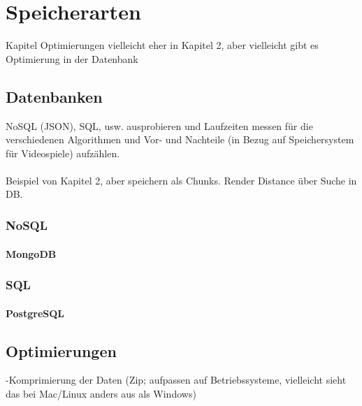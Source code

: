 \chapter{Speicherarten}\label{ch:speicherarten}

Kapitel Optimierungen vielleicht eher in Kapitel 2, aber vielleicht gibt es 
Optimierung in der Datenbank

\section{Datenbanken}
NoSQL (JSON), SQL, usw. ausprobieren und Laufzeiten messen für die verschiedenen Algorithmen 
und Vor- und Nachteile (in Bezug auf Speichersystem für Videospiele) aufzählen.\\
\\
Beispiel von Kapitel 2, aber speichern als Chunks. Render Distance über Suche in DB.

\subsection{NoSQL}
\subsubsection{MongoDB}
\subsection{SQL}
\subsubsection{PostgreSQL}

\section{Optimierungen}
-Komprimierung der Daten (Zip; aufpassen auf Betriebssysteme, vielleicht sieht das bei Mac/Linux anders aus als Windows)

